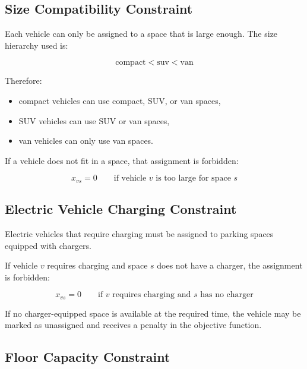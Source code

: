\documentclass[12pt,a4paper]{article}
\begin{document}
\subsection{Size Compatibility Constraint}

Each vehicle can only be assigned to a space that is large enough. The size hierarchy used is:

\begin{equation}
\text{compact} < \text{suv} < \text{van}
\end{equation}

Therefore:

\begin{itemize}
    \item compact vehicles can use compact, SUV, or van spaces,
    \item SUV vehicles can use SUV or van spaces,
    \item van vehicles can only use van spaces.
\end{itemize}

If a vehicle does not fit in a space, that assignment is forbidden:

\begin{equation}
x_{vs} = 0
\qquad
\text{if vehicle } v \text{ is too large for space } s
\end{equation}

\subsection{Electric Vehicle Charging Constraint}

Electric vehicles that require charging must be assigned to parking spaces equipped with chargers.

If vehicle $v$ requires charging and space $s$ does not have a charger, the assignment is forbidden:

\begin{equation}
x_{vs} = 0
\qquad
\text{if } v \text{ requires charging and } s \text{ has no charger}
\end{equation}

If no charger-equipped space is available at the required time, the vehicle may be marked as unassigned and receives a penalty in the objective function.

\subsection{Floor Capacity Constraint}
\end{document}
